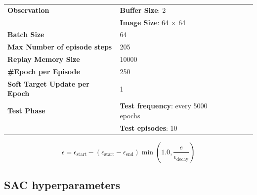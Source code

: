 \begin{table}[!h]
{\begin{tabular}{@{}lllll@{}}
			\textbf{Observation}                  & \textbf{Buffer Size}: 2                                           \\
			                                      & \textbf{Image Size}: 64 $\times$ 64                               \\\midrule
			\textbf{Batch Size}                   & 64                                                                \\\midrule
			\textbf{Max Number of episode steps}  & 205                                                               \\\midrule
			\textbf{Replay Memory Size}           & 10000                                                             \\\midrule

			\textbf{\#Epoch per Episode}          & 250                                                               \\\midrule
			\textbf{Soft Target Update per Epoch} & 1                                                                 \\\midrule
			\textbf{Test Phase}                   & \textbf{Test frequency}: every 5000 epochs                        \\
			                                      & \textbf{Test episodes}: 10                                        \\
			\bottomrule
		\end{tabular}}
\end{table}

\begin{equation}
	\label{eq:epsilon_decay}
	\epsilon = \epsilon_{\text{start}} - (\epsilon_{\text{start}} -\epsilon_{\text{end}})\min(1.0, \frac{e}{\epsilon_{\text{decay}}})
\end{equation}

\FloatBarrier

\subsection{SAC hyperparameters}

